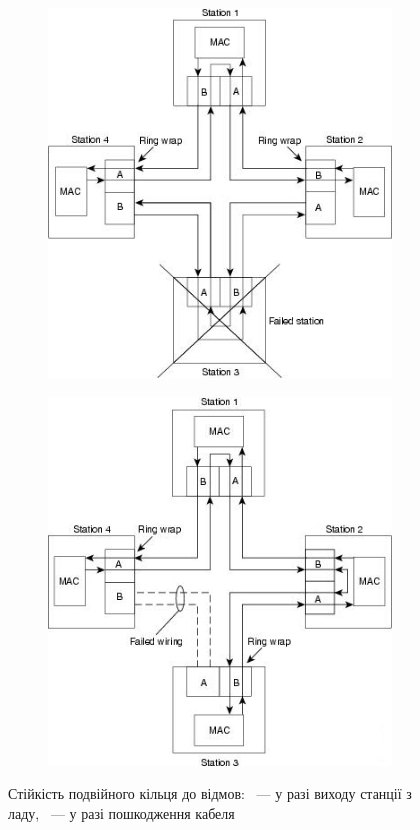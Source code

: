 \documentclass[
	a4paper,
	oneside,
	BCOR = 10mm,
	DIV = 12,
	12pt,
	headings = normal,
]{scrartcl}
\begin{document}
			\begin{figure}[!htbp]
				\centering
				\begin{subfigure}[t]{0.5\textwidth}
					\centering
					\includegraphics[height = 10\baselineskip]{./assets/y03s01-telecom-homework-01-p06a-station-failure.jpg}
					\caption{}
					\label{subfig:fddi-fault-tolerance-dual-ring-station-failure}
				\end{subfigure}%
				\begin{subfigure}[t]{0.5\textwidth}
					\centering
					\includegraphics[height = 10\baselineskip]{./assets/y03s01-telecom-homework-01-p06b-cable-failure.jpg}
					\caption{}
					\label{subfig:fddi-fault-tolerance-dual-ring-cable-failure}
				\end{subfigure}%
				\caption{Стійкість подвійного кільця до відмов: ~— у разі виходу станції з ладу, ~— у разі пошкодження кабеля}
				\label{fig:fddi-fault-tolerance-dual-ring}
			\end{figure}
\end{document}
